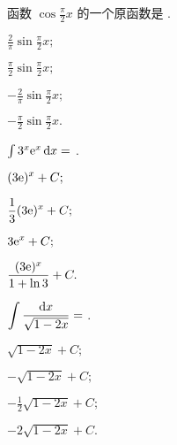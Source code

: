 \begin{problem} 函数 $\displaystyle \cos\frac{\pi}{2}x$ 的一个原函数是 .

\begin{abcd} 
	
\item$\displaystyle \frac{2}{\pi}\sin\frac{\pi}{2}x;$

\item $\displaystyle \frac{\pi}{2}\sin\frac{\pi}{2}x;$

\item $\displaystyle - \frac{2}{\pi}\sin\frac{\pi}{2}x;$

\item $\displaystyle - \frac{\pi}{2}\sin\frac{\pi}{2}{x.}$

\end{abcd}

\end{problem}           

\begin{problem} $\int 3^{x}\mathrm{e}^{x}\mathop{}\!\mathrm{d} x =$ .

\begin{abcd} 
\item$\displaystyle (3\mathrm{e})^{x} + C;$

\item $\displaystyle \frac{1}{3}(3\mathrm{e})^{x} + C;$

\item $\displaystyle 3\mathrm{e}^{x} + C;$

\item $\displaystyle \frac{(3\mathrm{e})^{x}}{1 + \ln 3} + C.$

\end{abcd}

\end{problem}           

\begin{problem} $\displaystyle \int \frac{{\mathop{}\!\mathrm{d} x}}{\sqrt{1 - 2x}} =$ .

\begin{abcd} 
	
\item$\sqrt{1 - 2x} + C;$

\item $- \sqrt{1 - 2x} + C;$

\item $- \frac{1}{2}\sqrt{1 - 2x} + C;$

\item $- 2\sqrt{1 - 2x} + C.$

\end{abcd}

\end{problem}           

